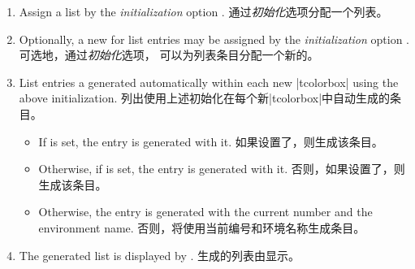 \begin{enumerate}
\item 
\begin{stripedbox}
Assign a list  by the \emph{initialization} option
.
\tcblower
通过\emph{初始化}选项分配一个列表。
\end{stripedbox}

\item 
\begin{stripedbox}
Optionally, a new  for list entries may be assigned
by the \emph{initialization} option .
\tcblower
可选地，通过\emph{初始化}选项，%
可以为列表条目分配一个新的。
\end{stripedbox}

\item 
\begin{stripedbox}
List entries a generated automatically within each new |tcolorbox|
using the above initialization.
\tcblower
列出使用上述初始化在每个新|tcolorbox|中自动生成的条目。
\end{stripedbox}
    \begin{itemize}
    \item 
\begin{stripedbox}
If  is set, the entry is generated with it.
\tcblower
如果设置了，则生成该条目。
\end{stripedbox}
    
    \item 
\begin{stripedbox}
Otherwise, if  is set, the entry is generated with it.
\tcblower
否则，如果设置了，则生成该条目。
\end{stripedbox}
    
    \item 
\begin{stripedbox}
Otherwise, the entry is generated with the current number and the environment name.
\tcblower
否则，将使用当前编号和环境名称生成条目。
\end{stripedbox}
    
    \end{itemize}
\item 
\begin{stripedbox}
The generated list is displayed by .
\tcblower
生成的列表由显示。
\end{stripedbox}
\end{enumerate}

